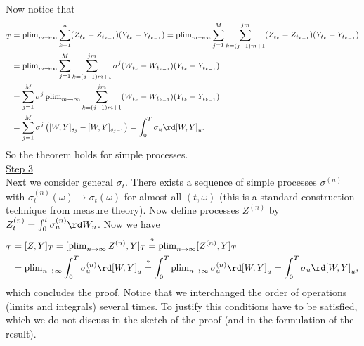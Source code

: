 \documentclass{article}
\begin{document}
Now notice that
\begin{align*}
[Z,Y]_T&=\operatorname{plim}_{m\to\infty}
\sum_{k=1}^n (Z_{t_k}-Z_{t_{k-1}})(Y_{t_k}-Y_{t_{k-1}})
=\operatorname{plim}_{m\to\infty}\sum_{j=1}^{M} \sum_{k=(j-1)m+1}^{jm}   (Z_{t_k}-Z_{t_{k-1}})(Y_{t_k}-Y_{t_{k-1}})
\\
&=\operatorname{plim}_{m\to\infty}
\sum_{j=1}^M
\sum_{k=(j-1)m+1}^{jm} \sigma^j (W_{t_k}-W_{t_{k-1}})(Y_{t_k}-Y_{t_{k-1}})
\\
&=
\sum_{j=1}^M \sigma^j \operatorname{plim}_{m\to\infty} \sum_{k=(j-1)m+1}^{jm}  (W_{t_k}-W_{t_{k-1}})(Y_{t_k}-Y_{t_{k-1}})
\\
&=
\sum_{j=1}^M \sigma^j \left( [W,Y]_{s_j} -[W,Y]_{s_{j-1}}\right)=\int_0^T \sigma_u \rd [W,Y]_u.
\end{align*}
So the theorem holds for simple processes.
\\
\underline{Step 3} \\
Next we consider general $\sigma_t$. There exists a sequence of simple processes $\sigma^{(n)}$ with $\sigma^{(n)}_t(\omega)\to \sigma_t(\omega)$ for almost all $(t,\omega)$ (this is a standard construction technique from measure theory).
Now define processes $Z^{(n)}$ by $Z^{(n)}_t=\int_0^t\sigma^{(n)}_u \rd W_u$.
Now we have
\begin{align*}
[X,Y]_T&=[Z,Y]_T=[ \operatorname{plim}_{n\to\infty} Z^{(n)},Y]_T\stackrel{?}{=}\operatorname{plim}_{n\to\infty}[ Z^{(n)},Y]_T \\
&=\operatorname{plim}_{n\to\infty} \int_0^T \sigma^{(n)}_u \rd [W,Y]_u
\stackrel{?}{=}\int_0^T\operatorname{plim}_{n\to\infty} \sigma^{(n)}_u \rd [W,Y]_u= \int_0^T \sigma_u \rd [W,Y]_u,
\end{align*}
which concludes the proof.
Notice that we interchanged the order of operations (limits and integrals) several times. To justify this conditions have to be satisfied, which we do not discuss in the sketch of the proof (and in the formulation of the result).
\end{document}
